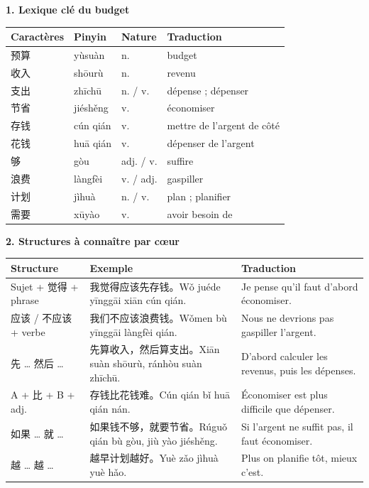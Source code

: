 \documentclass[11pt]{article}
\begin{document}
\begin{bilan}
\textbf{1. Lexique clé du budget}
\begin{center}
\begin{tabularx}{\linewidth}{|X|X|X|X|}\hline
\rowcolor{popblueL} Caractères & Pinyin & Nature & Traduction \\ \hline
预算 & yùsuàn & n. & budget \\ \hline
收入 & shōurù & n. & revenu \\ \hline
支出 & zhīchū & n. / v. & dépense ; dépenser \\ \hline
节省 & jiéshěng & v. & économiser \\ \hline
存钱 & cún qián & v. & mettre de l'argent de côté \\ \hline
花钱 & huā qián & v. & dépenser de l'argent \\ \hline
够 & gòu & adj. / v. & suffire \\ \hline
浪费 & làngfèi & v. / adj. & gaspiller \\ \hline
计划 & jìhuà & n. / v. & plan ; planifier \\ \hline
需要 & xūyào & v. & avoir besoin de \\ \hline
\end{tabularx}
\end{center}

\textbf{2. Structures à connaître par cœur}
\begin{center}
\begin{tabularx}{\linewidth}{|X|X|X|}\hline
\rowcolor{popblueL} Structure & Exemple & Traduction \\ \hline
Sujet + 觉得 + phrase & 我觉得应该先存钱。Wǒ juéde yīnggāi xiān cún qián. & Je pense qu'il faut d'abord économiser. \\ \hline
应该 / 不应该 + verbe & 我们不应该浪费钱。Wǒmen bù yīnggāi làngfèi qián. & Nous ne devrions pas gaspiller l'argent. \\ \hline
先 … 然后 … & 先算收入，然后算支出。Xiān suàn shōurù, ránhòu suàn zhīchū. & D'abord calculer les revenus, puis les dépenses. \\ \hline
A + 比 + B + adj. & 存钱比花钱难。Cún qián bǐ huā qián nán. & Économiser est plus difficile que dépenser. \\ \hline
如果 … 就 … & 如果钱不够，就要节省。Rúguǒ qián bù gòu, jiù yào jiéshěng. & Si l'argent ne suffit pas, il faut économiser. \\ \hline
越 … 越 … & 越早计划越好。Yuè zǎo jìhuà yuè hǎo. & Plus on planifie tôt, mieux c'est. \\ \hline
\end{tabularx}
\end{center}


\end{bilan}
\end{document}
